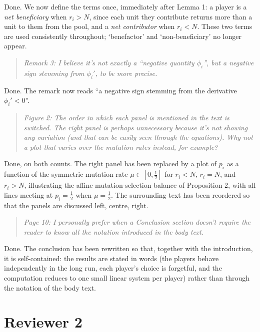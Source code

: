 \documentclass[11pt]{article}
\newenvironment{reviewerquote}
  {\begin{quote}\itshape}
  {\end{quote}}
\begin{document}
Done. We now define the terms once, immediately after Lemma 1: a player is a
\emph{net beneficiary} when \(r_i>N\), since each unit they contribute
returns more than a unit to them from the pool, and a \emph{net contributor}
when \(r_i<N\). These two terms are used consistently throughout; `benefactor'
and `non-beneficiary' no longer appear.

\begin{reviewerquote}
Remark 3: I believe it's not exactly a ``negative quantity \(\phi_i\)'', but
a negative sign stemming from \(\phi_i'\), to be more precise.
\end{reviewerquote}

Done. The remark now reads ``a negative sign stemming from the derivative
\(\phi_i'<0\)''.

\begin{reviewerquote}
Figure 2: The order in which each panel is mentioned in the text is switched.
The right panel is perhaps unnecessary because it's not showing any variation
(and that can be easily seen through the equations). Why not a plot that
varies over the mutation rates instead, for example?
\end{reviewerquote}

Done, on both counts. The right panel has been replaced by a plot of \(p_i\)
as a function of the symmetric mutation rate \(\mu\in[0,\tfrac{1}{2}]\) for
\(r_i<N\), \(r_i=N\), and \(r_i>N\), illustrating the affine
mutation-selection balance of Proposition 2, with all lines meeting at
\(p_i=\tfrac{1}{2}\) when \(\mu=\tfrac{1}{2}\). The surrounding text has been
reordered so that the panels are discussed left, centre, right.

\begin{reviewerquote}
Page 10: I personally prefer when a Conclusion section doesn't require the
reader to know all the notation introduced in the body text.
\end{reviewerquote}

Done. The conclusion has been rewritten so that, together with the
introduction, it is self-contained: the results are stated in words (the
players behave independently in the long run, each player's choice is
forgetful, and the computation reduces to one small linear system per
player) rather than through the notation of the body text.

\section*{Reviewer 2}
\end{document}
